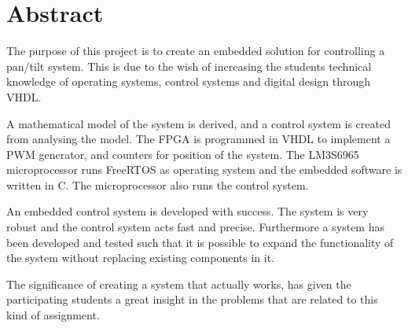 \chapter*{Abstract}
The purpose of this project is to create an embedded solution for controlling a pan/tilt system. This is due to the wish of increasing the students technical knowledge of operating systems, control systems and digital design through VHDL.

A mathematical model of the system is derived, and a control system is created from analysing the model. The FPGA is programmed in VHDL to implement a PWM generator, and counters for position of the system. The LM3S6965 microprocessor runs FreeRTOS as operating system and the embedded software is written in C. The microprocessor also runs the control system.

An embedded control system is developed with success. The system is very robust and the control system acts fast and precise. Furthermore a system has been developed and tested such that it is possible to expand the functionality of the system without replacing existing components in it.

The significance of creating a system that actually works, has given the participating students a great insight in the problems that are related to this kind of assignment.